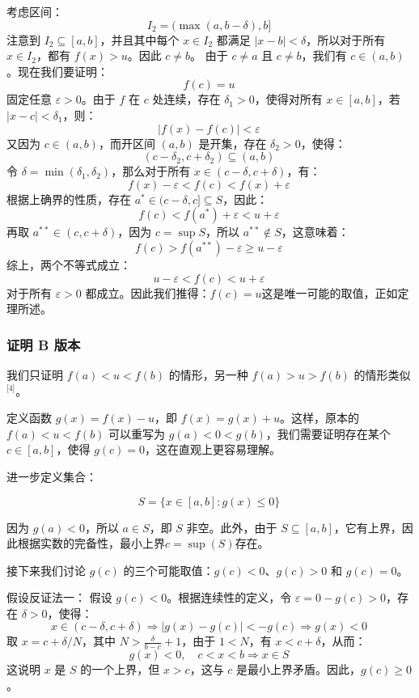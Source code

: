 考虑区间：
$$
I_2 = (\max(a, b - \delta), b]~
$$
注意到 $I_2 \subseteq [a, b]$，并且其中每个 $x \in I_2$ 都满足 $|x - b| < \delta$，所以对于所有 $x \in I_2$，都有 $f(x) > u$。因此 $c \neq b$。
由于 $c \neq a$ 且 $c \neq b$，我们有 $c \in (a, b)$。现在我们要证明：
$$
f(c) = u~
$$
固定任意 $\varepsilon > 0$。由于 $f$ 在 $c$ 处连续，存在 $\delta_1 > 0$，使得对所有 $x \in [a, b]$，若 $|x - c| < \delta_1$，则：
$$
|f(x) - f(c)| < \varepsilon~
$$
又因为 $c \in (a, b)$，而开区间 $(a, b)$ 是开集，存在 $\delta_2 > 0$，使得：
$$
(c - \delta_2, c + \delta_2) \subseteq (a, b)~
$$
令 $\delta = \min(\delta_1, \delta_2)$，那么对于所有 $x \in (c - \delta, c + \delta)$，有：
$$
f(x) - \varepsilon < f(c) < f(x) + \varepsilon~
$$
根据上确界的性质，存在 $a^* \in (c - \delta, c] \subseteq S$，因此：
$$
f(c) < f(a^*) + \varepsilon < u + \varepsilon~
$$
再取 $a^{**} \in (c, c + \delta)$，因为 $c = \sup S$，所以 $a^{**} \notin S$，这意味着：
$$
f(c) > f(a^{**}) - \varepsilon \geq u - \varepsilon~
$$
综上，两个不等式成立：
$$
u - \varepsilon < f(c) < u + \varepsilon~
$$
对于所有 $\varepsilon > 0$ 都成立。因此我们推得：$f(c) = u$这是唯一可能的取值，正如定理所述。
\subsubsection{证明 B 版本}
我们只证明 $f(a) < u < f(b)$ 的情形，另一种 $f(a) > u > f(b)$ 的情形类似\(^\text{[4]}\)。

定义函数 $g(x) = f(x) - u$，即 $f(x) = g(x) + u$。这样，原本的 $f(a) < u < f(b)$ 可以重写为 $g(a) < 0 < g(b)$，我们需要证明存在某个 $c \in [a, b]$，使得 $g(c) = 0$，这在直观上更容易理解。

进一步定义集合：

$$
S = \{x \in [a, b] : g(x) \leq 0\}~
$$

因为 $g(a) < 0$，所以 $a \in S$，即 $S$ 非空。此外，由于 $S \subseteq [a, b]$，它有上界，因此根据实数的完备性，最小上界$c = \sup(S)$存在。

接下来我们讨论 $g(c)$ 的三个可能取值：$g(c) < 0$、$g(c) > 0$ 和 $g(c) = 0$。

假设反证法一： 假设 $g(c) < 0$。根据连续性的定义，令 $\varepsilon = 0 - g(c) > 0$，存在 $\delta > 0$，使得：
$$
x \in (c - \delta, c + \delta) \Rightarrow |g(x) - g(c)| < -g(c) \Rightarrow g(x) < 0~
$$
取 $x = c + \delta/N$，其中 $N > \frac{\delta}{b - c} + 1$，由于 $1 < N$，有 $x < c + \delta$，从而：
$$
g(x) < 0,\quad c < x < b \Rightarrow x \in S~
$$
这说明 $x$ 是 $S$ 的一个上界，但 $x > c$，这与 $c$ 是最小上界矛盾。因此，$g(c) \geq 0$。

